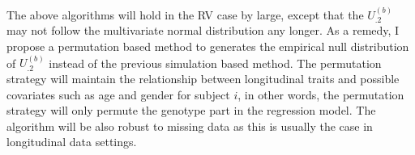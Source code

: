\documentclass[12pt]{article}
\begin{document}
The above algorithms will hold in the RV case by large, except that the $U_{.2}^{ (b) }$ may not follow the multivariate normal distribution any longer. As a remedy, I propose a permutation based method to generates the empirical null distribution of $U_{.2}^{ (b) }$ instead of the previous simulation based method. The permutation strategy will maintain the relationship between longitudinal traits and possible covariates such as age and gender for subject $i$, in other words, the permutation strategy will only permute the genotype part in the regression model. The algorithm will be also robust to missing data as this is usually the case in longitudinal data settings. 
\end{document}
